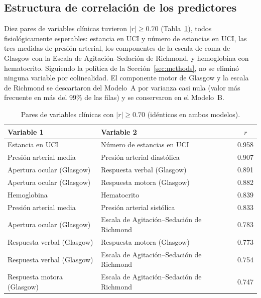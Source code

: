 \documentclass[healthcare,article,submit,pdftex,moreauthors]{Definitions/mdpi_es}
\begin{document}
\subsection{Estructura de correlación de los predictores}
Diez pares de variables clínicas tuvieron $|r|\geq 0.70$ (Tabla~\ref{tab:corr}), todos
fisiológicamente esperables: estancia en UCI y número de estancias en UCI, las tres medidas de presión
arterial, los componentes de la escala de coma de Glasgow con la Escala de Agitación--Sedación de
Richmond, y hemoglobina con hematocrito. Siguiendo la política de la Sección~\ref{sec:methods}, no se
eliminó ninguna variable por colinealidad. El componente motor de Glasgow y la escala de Richmond se
descartaron del Modelo~A por varianza casi nula (valor más frecuente en más del 99\% de las filas) y se
conservaron en el Modelo~B.

\begin{table}[H]
\caption{Pares de variables clínicas con $|r|\geq 0.70$ (idénticos en ambos modelos).\label{tab:corr}}
\begin{tabularx}{\textwidth}{llc}
\toprule
\textbf{Variable 1} & \textbf{Variable 2} & \textbf{$r$}\\
\midrule
Estancia en UCI & Número de estancias en UCI & 0.958\\
Presión arterial media & Presión arterial diastólica & 0.907\\
Apertura ocular (Glasgow) & Respuesta verbal (Glasgow) & 0.891\\
Apertura ocular (Glasgow) & Respuesta motora (Glasgow) & 0.882\\
Hemoglobina & Hematocrito & 0.839\\
Presión arterial media & Presión arterial sistólica & 0.833\\
Apertura ocular (Glasgow) & Escala de Agitación--Sedación de Richmond & 0.783\\
Respuesta verbal (Glasgow) & Respuesta motora (Glasgow) & 0.773\\
Respuesta verbal (Glasgow) & Escala de Agitación--Sedación de Richmond & 0.754\\
Respuesta motora (Glasgow) & Escala de Agitación--Sedación de Richmond & 0.747\\
\bottomrule
\end{tabularx}
\end{table}
\end{document}
